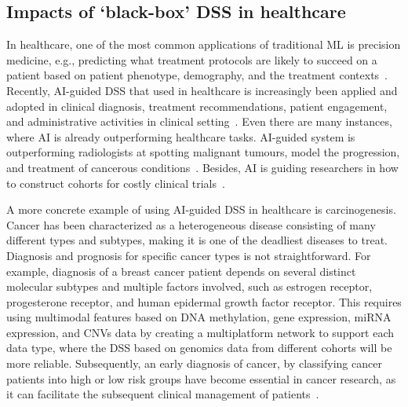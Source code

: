 \subsection{Impacts of `black-box' DSS in healthcare}
In healthcare, one of the most common applications of traditional ML is precision medicine, e.g., predicting what treatment protocols are likely to succeed on a patient based on patient phenotype, demography, and the treatment contexts~\cite{davenport2019potential}. Recently, AI-guided DSS that used in healthcare is increasingly been applied and adopted in clinical diagnosis, treatment recommendations, patient engagement, and administrative activities in clinical setting~\cite{deepmindhealth}. Even there are many instances, where AI is already outperforming healthcare tasks. AI-guided system is outperforming radiologists at spotting malignant tumours, model the progression, and treatment of cancerous conditions~\cite{deepmindhealth}. Besides, AI is guiding researchers in how to construct cohorts for costly clinical trials~\cite{davenport2019potential}. 

\hspace*{3.5mm} A more concrete example of using AI-guided DSS in healthcare is carcinogenesis. Cancer has been characterized as a heterogeneous disease consisting of many different types and subtypes, making it is one of the deadliest diseases to treat. Diagnosis and prognosis for specific cancer types is not straightforward. For example, diagnosis of a breast cancer patient depends on several distinct molecular subtypes and multiple factors involved, such as estrogen receptor, progesterone receptor, and human epidermal growth factor receptor. %
This requires using multimodal features based on DNA methylation, gene expression, miRNA expression, and CNVs data by creating a multiplatform network to support each data type, where the DSS based on genomics data from different cohorts will be more reliable. Subsequently, an early diagnosis of cancer, by classifying cancer patients into high or low risk groups have become essential in cancer research, as it can facilitate the subsequent clinical management of patients~\cite{kourou2015machine}.  

